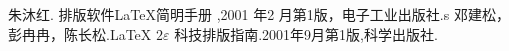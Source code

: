 \begin{thebibliography}{aa}
 朱沐红. 排版软件{\LaTeX}简明手册 ,2001 年2 月第1版，电子工业出版社.s
 邓建松，彭冉冉，陈长松.{\LaTeX} $2\varepsilon$ 科技排版指南.2001年9月第1版,科学出版社.
\end{thebibliography}
